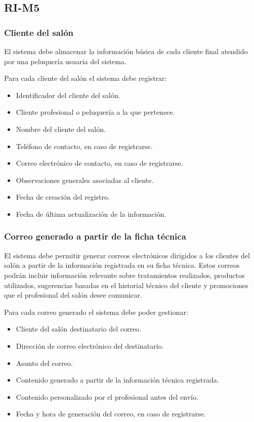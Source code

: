 \subsection{RI-M5}

\subsubsection*{Cliente del salón}

El sistema debe almacenar la información básica de cada cliente final atendido por una peluquería usuaria del sistema.

Para cada cliente del salón el sistema debe registrar:

\begin{itemize}
    \item Identificador del cliente del salón.
    \item Cliente profesional o peluquería a la que pertenece.
    \item Nombre del cliente del salón.
    \item Teléfono de contacto, en caso de registrarse.
    \item Correo electrónico de contacto, en caso de registrarse.
    \item Observaciones generales asociadas al cliente.
    \item Fecha de creación del registro.
    \item Fecha de última actualización de la información.
\end{itemize}

\subsubsection*{Correo generado a partir de la ficha técnica}

El sistema debe permitir generar correos electrónicos dirigidos a los clientes del salón a partir de la información registrada en su ficha técnica. Estos correos podrán incluir información relevante sobre tratamientos realizados, productos utilizados, sugerencias basadas en el historial técnico del cliente y promociones que el profesional del salón desee comunicar.

Para cada correo generado el sistema debe poder gestionar:

\begin{itemize}
    \item Cliente del salón destinatario del correo.
    \item Dirección de correo electrónico del destinatario.
    \item Asunto del correo.
    \item Contenido generado a partir de la información técnica registrada.
    \item Contenido personalizado por el profesional antes del envío.
    \item Fecha y hora de generación del correo, en caso de registrarse.
\end{itemize}

